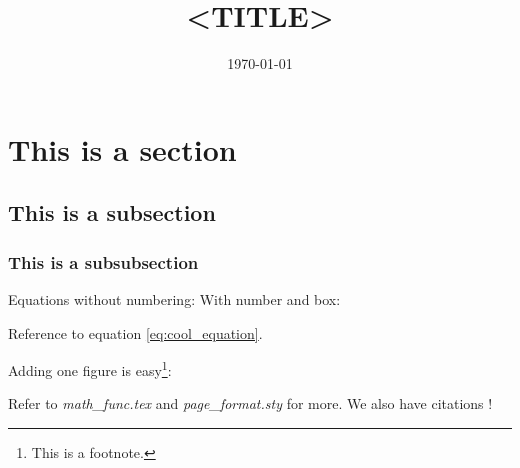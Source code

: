 \documentclass[12pt, a4paper]{article}
\title{<TITLE>} %
\author{\JL} %
\date{\today} %
\begin{document}
\maketitlepage

\maketableofcontents

\section{This is a section}
\subsection{This is a subsection}
\subsubsection{This is a subsubsection}
Equations without numbering:
With number and box:

Reference to equation \eqref{eq:cool_equation}.


Adding one figure is easy\footnote{This is a footnote.}:

Refer to \textit{math\_func.tex} and \textit{page\_format.sty} for more. We also have citations \cite{CitekeyBook}!

\makereferences

\blankpage

\end{document}

